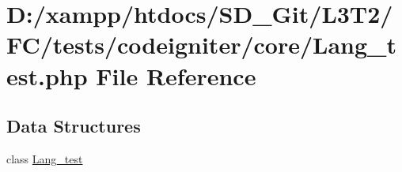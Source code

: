 \hypertarget{tests_2codeigniter_2core_2_lang__test_8php}{}\section{D\+:/xampp/htdocs/\+S\+D\+\_\+\+Git/\+L3\+T2/\+F\+C/tests/codeigniter/core/\+Lang\+\_\+test.php File Reference}
\label{tests_2codeigniter_2core_2_lang__test_8php}
\subsection*{Data Structures}
\begin{DoxyCompactItemize}
\item 
class \hyperlink{class_lang__test}{Lang\+\_\+test}
\end{DoxyCompactItemize}
